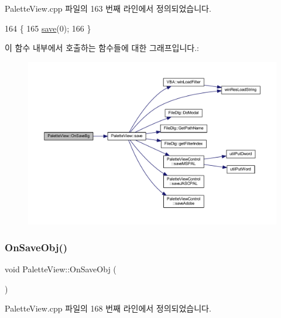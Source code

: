 Palette\+View.\+cpp 파일의 163 번째 라인에서 정의되었습니다.


\begin{DoxyCode}
164 \{
165   \mbox{\hyperlink{class_palette_view_a107b71060221c9d44bdf0d38ca77c689}{save}}(0);
166 \}
\end{DoxyCode}
이 함수 내부에서 호출하는 함수들에 대한 그래프입니다.\+:
\nopagebreak
\begin{figure}[H]
\begin{center}
\leavevmode
\includegraphics[width=350pt]{class_palette_view_a4e11f19e5535efcd1b34d38899f18482_cgraph}
\end{center}
\end{figure}
\mbox{\label{class_palette_view_a1a09199a2ab1045bbbcef736d05296c1}} 
\subsubsection{\texorpdfstring{On\+Save\+Obj()}{OnSaveObj()}}
{\footnotesize\ttfamily void Palette\+View\+::\+On\+Save\+Obj (\begin{DoxyParamCaption}{ }\end{DoxyParamCaption})\hspace{0.3cm}{\ttfamily [protected]}}



Palette\+View.\+cpp 파일의 168 번째 라인에서 정의되었습니다.



